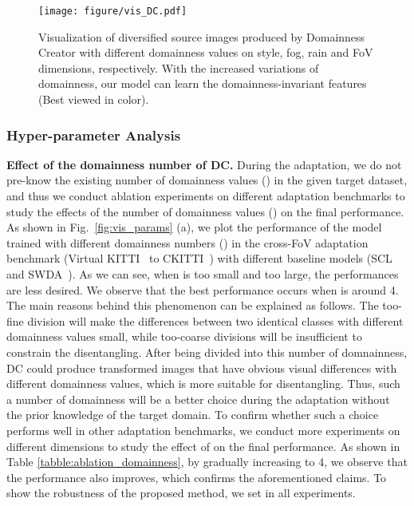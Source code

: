 \documentclass[10pt,journal,compsoc]{IEEEtran}
\begin{document}
\begin{figure*}[t]
\centering
\texttt{[image: figure/vis\_DC.pdf]}
\caption{
Visualization of diversified source images produced by Domainness Creator with different domainness values on style, fog, rain and FoV dimensions, respectively. 
With the increased variations of domainness, our model can learn the domainness-invariant features (Best viewed in color).
}
\label{fig:dc_results}
\end{figure*}
\subsubsection{Hyper-parameter Analysis}

\noindent \textbf{Effect of the domainness number of DC.}  
During the adaptation, we do not pre-know the existing number of domainness values () in the given target dataset, and thus we conduct ablation experiments on different adaptation benchmarks to study the effects of the number of domainness values () on the final performance. 
As shown in Fig.~\ref{fig:vis_params} (a), we plot the performance of the model trained with different domainness numbers () in the cross-FoV adaptation benchmark (Virtual KITTI~\cite{VKITTI} to CKITTI~\cite{cordts2016cityscapes,kITTI})  with different baseline models (SCL~\cite{SCL} and SWDA~\cite{SWDA}). As we can see, when  is too small and too large, the performances are less desired. We observe that the best performance occurs when  is around 4. The main reasons behind this phenomenon can be explained as follows. The too-fine division will make the differences between two identical classes with different domainness values small, while too-coarse divisions will be insufficient to constrain the disentangling. After being divided into this number of domnainness, DC could produce transformed images that have obvious visual differences with different domainness values, which is more suitable for disentangling. Thus, such a number of domainness will be a better choice during the adaptation without the prior knowledge  of the target domain. 
To confirm whether such a choice performs well in other adaptation benchmarks, we conduct more experiments on different dimensions to study the effect of  on the final performance. As shown in Table \ref{tabble:ablation_domainness}, by gradually increasing  to 4, we observe that the performance also improves, which confirms the aforementioned claims. To show the robustness of the proposed method, we set  in all experiments. 
\end{document}
